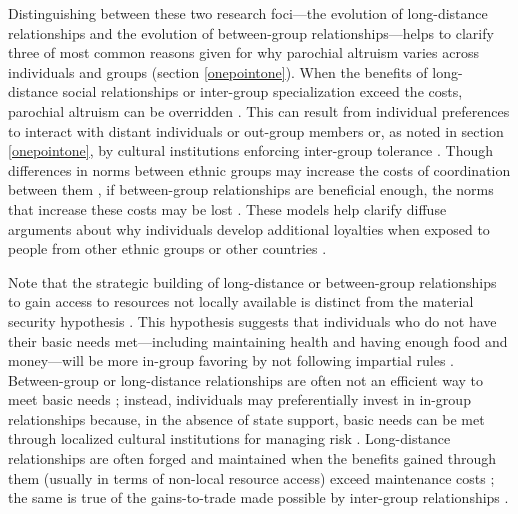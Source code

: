 \documentclass[bibauthoryear]{aa}
\begin{document}
Distinguishing between these two research foci---the evolution of long-distance relationships and the evolution of between-group relationships---helps to clarify three of most common reasons given for why parochial altruism varies across individuals and groups (section \ref{onepointone}). When the benefits of long-distance social relationships or inter-group specialization exceed the costs, parochial altruism can be overridden \citep[e.g.,][]{bellmoya}. This can result from individual preferences to interact with distant individuals \citep{pisor2019evolution} or out-group members \citep{moya2015different, brewer1976ethnocentrism} or, as noted in section \ref{onepointone}, by cultural institutions enforcing inter-group tolerance \citep{fearon1996explaining, fry2018evolutionary}. Though differences in norms between ethnic groups may increase the costs of coordination between them \citep{bellmoya, habyarimana2007does, mcelreath2003shared}, if between-group relationships are beneficial enough, the norms that increase these costs may be lost \citep{bunce2017interethnic, bunce2018sustainability}. These models help clarify diffuse arguments about why individuals develop additional loyalties when exposed to people from other ethnic groups or other countries \citep[e.g.,][]{brewer1976ethnocentrism, beck2006cosmopolitan, hruschka2013economic, buchan2009globalization, fukuyama2001social, mau2008cosmopolitan, singer2011expanding}.

Note that the strategic building of long-distance or between-group relationships to gain access to resources not locally available is distinct from the material security hypothesis \citep{hruschka2013economic, hruschka2014impartial}. This hypothesis suggests that individuals who do not have their basic needs met---including maintaining health and having enough food and money---will be more in-group favoring by not following impartial rules \citep{hruschka2014impartial}. Between-group or long-distance relationships are often not an efficient way to meet basic needs \citep{minnis1985social}; instead, individuals may preferentially invest in in-group relationships because, in the absence of state support, basic needs can be met through localized cultural institutions for managing risk \citep{pisorjones2020}. Long-distance relationships are often forged and maintained when the benefits gained through them (usually in terms of non-local resource access) exceed maintenance costs \citep{pisor2019evolution}; the same is true of the gains-to-trade made possible by inter-group relationships \citep{bellmoya}.
\end{document}
